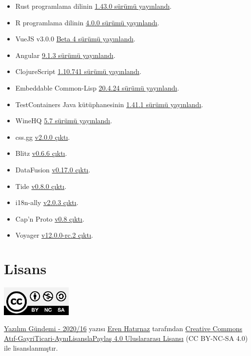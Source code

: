 \documentclass[11pt]{article}
\begin{document}
\begin{itemize}
\item Rust programlama dilinin \href{https://blog.rust-lang.org/2020/04/23/Rust-1.43.0.html}{1.43.0 sürümü yayınlandı}.
\item R programlama dilinin \href{https://stat.ethz.ch/pipermail/r-announce/2020/000653.html}{4.0.0 sürümü yayınlandı}.
\item VueJS v3.0.0 \href{https://github.com/vuejs/vue-next/releases/tag/v3.0.0-beta.4}{Beta 4 sürümü yayınlandı}.
\item Angular \href{https://github.com/angular/angular/releases/tag/9.1.3}{9.1.3 sürümü yayınlandı}.
\item ClojureScript \href{https://clojurescript.org/news/2020-04-24-release}{1.10.741 sürümü yayınlandı}.
\item Embeddable Common-Lisp \href{https://common-lisp.net/project/ecl/posts/ECL-20424-release.html}{20.4.24 sürümü yayınlandı}.
\item TestContainers Java kütüphanesinin \href{https://github.com/testcontainers/testcontainers-java/releases/tag/1.14.1}{1.41.1 sürümü yayınlandı}.
\item WineHQ \href{https://www.winehq.org/announce/5.7}{5.7 sürümü yayınlandı}.
\item css.gg \href{https://github.com/astrit/css.gg/releases/tag/2.0.0}{v2.0.0 çıktı}.
\item Blitz \href{https://github.com/blitz-js/blitz/releases/tag/v0.6.6}{v0.6.6 çıktı}.
\item DataFusion \href{https://andygrove.io/2020/04/datafusion-0.17.0/}{v0.17.0 çıktı}.
\item Tide \href{https://github.com/http-rs/tide/releases/tag/v0.8.0}{v0.8.0 çıktı}.
\item i18n-ally \href{https://github.com/antfu/i18n-ally/releases/tag/v2.0.3}{v2.0.3 çıktı}.
\item Cap'n Proto \href{https://capnproto.org/news/2020-04-23-capnproto-0.8.html}{v0.8 çıktı}.
\item Voyager \href{https://github.com/appscode/voyager/releases/tag/v12.0.0-rc.2}{v12.0.0-rc.2 çıktı}.
\end{itemize}
\section{Lisans}
\label{sec:orge8e9961}
\begin{center}
\begin{center}
\includegraphics[height=1.5cm]{../../../img/CC_BY-NC-SA_4.0.png}
\end{center}

\href{yazilim-gundemi-2020-16.pdf}{Yazılım Gündemi - 2020/16} yazısı \href{https://erenhatirnaz.github.io}{Eren Hatırnaz} tarafından \href{http://creativecommons.org/licenses/by-nc-sa/4.0/}{Creative Commons
Atıf-GayriTicari-AynıLisanslaPaylaş 4.0 Uluslararası Lisansı} (CC BY-NC-SA 4.0)
ile lisanslanmıştır.
\end{center}
\end{document}
